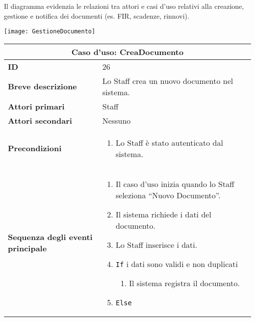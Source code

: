 \documentclass[a4paper]{report}
\begin{document}
\clearpage


Il diagramma evidenzia le relazioni tra attori e casi d’uso relativi alla creazione, gestione e notifica dei documenti (es. FIR, scadenze, rinnovi).

\begin{figure*}[ht]
    \centering
    \texttt{[image: GestioneDocumento]}
\end{figure*}

\clearpage
\renewcommand{\arraystretch}{1.9}
\begin{table}[H]
\vspace*{-0cm}
\begin{tabular}{|p{3.9cm}|p{9.9cm}|}
\hline
\multicolumn{2}{|c|}{\textbf{Caso d’uso: CreaDocumento}} \\ \hline
	\textbf{ID} & 26 \\ \hline
	\textbf{Breve descrizione} & Lo Staff crea un nuovo documento nel sistema. \\ \hline
	\textbf{Attori primari} & Staff \\ \hline
	\textbf{Attori secondari} & Nessuno \\ \hline
	\textbf{Precondizioni} & \begin{enumerate}[leftmargin=14pt,label=\arabic*.,labelsep=0.5em,topsep=0pt,partopsep=0pt,parsep=0pt,itemsep=0pt]
        \item Lo Staff è stato autenticato dal sistema.
    \end{enumerate} \\ \hline
	\textbf{Sequenza degli eventi principale} &
\begin{enumerate}[leftmargin=14pt,label=\arabic*.,labelsep=0.5em,topsep=0pt,partopsep=0pt,parsep=0pt,itemsep=0pt]
    \item Il caso d’uso inizia quando lo Staff seleziona “Nuovo Documento”.
    \item Il sistema richiede i dati del documento.
    \item Lo Staff inserisce i dati.
    \item \texttt{If} i dati sono validi e non duplicati
    \begin{enumerate}[label=\arabic{enumi}.\arabic*.,leftmargin=22pt,labelsep=0.5em,topsep=0pt,partopsep=0pt,parsep=0pt,itemsep=0pt]
        \item Il sistema registra il documento.
    \end{enumerate}
    \item \texttt{Else}

\end{enumerate}
\end{tabular}
\end{table}
\end{document}
